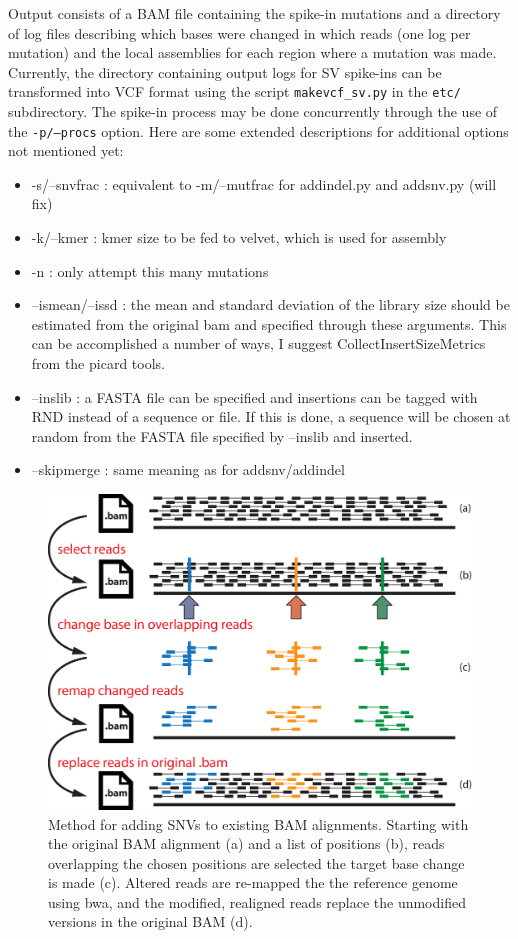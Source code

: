 \documentclass[letterpaper,11pt]{article}
\begin{document}
     Output consists of a BAM file containing the spike-in mutations and a directory of log files describing which bases were changed in which reads (one log per mutation) and the local assemblies for each region where a mutation was made. Currently, the directory containing output logs for SV spike-ins can be transformed into VCF format using the script \texttt {makevcf\_sv.py} in the \texttt {etc/} subdirectory. The spike-in process may be done concurrently through the use of the \texttt {-p/--procs} option. Here are some extended descriptions for additional options not mentioned yet:
     
\begin{itemize}
\item -s/--snvfrac : equivalent to -m/--mutfrac for addindel.py and addsnv.py (will fix)
\item -k/--kmer : kmer size to be fed to velvet, which is used for assembly
\item -n : only attempt this many mutations
\item --ismean/--issd : the mean and standard deviation of the library size should be estimated from the original bam and specified through these arguments. This can be accomplished a number of ways, I suggest CollectInsertSizeMetrics from the picard tools.
\item --inslib : a FASTA file can be specified and insertions can be tagged with RND instead of a sequence or file. If this is done, a sequence will be chosen at random from the FASTA file specified by --inslib and inserted.
\item --skipmerge : same meaning as for addsnv/addindel
\end{itemize}

\newpage %
\begin{figure}[!h]
\centering
\includegraphics[width=5.5in]{bamsurgeon_snv.eps}
\caption{Method for adding SNVs to existing BAM alignments. Starting with the original BAM alignment (a) and a list of positions (b), reads overlapping the chosen positions are selected the target base change is made (c). Altered reads are re-mapped the the reference genome using bwa, and the modified, realigned reads replace the unmodified versions in the original BAM (d).}
\end{figure}
\end{document}
